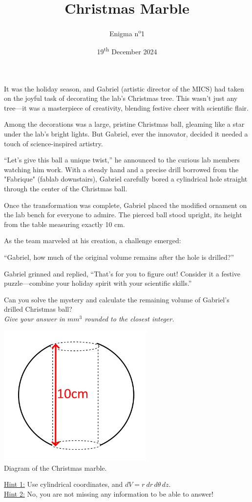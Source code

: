 \documentclass[a4paper, top=10mm]{article}
\title{\textbf{\huge{Christmas Marble}}}
\author{Enigma n\textsuperscript{o}1}
\date{19\textsuperscript{th} December 2024}
\begin{document}
	\maketitle
	
	It was the holiday season, and Gabriel (artistic director of the MICS) had taken on the joyful task of decorating the lab’s Christmas tree.
	This wasn’t just any tree—it was a masterpiece of creativity, blending festive cheer with scientific flair.
	
	Among the decorations was a large, pristine Christmas ball, gleaming like a star under the lab’s bright lights.
	But Gabriel, ever the innovator, decided it needed a touch of science-inspired artistry.
	
	“Let’s give this ball a unique twist,” he announced to the curious lab members watching him work. With a steady hand and a precise drill borrowed from the "Fabrique" (fablab downstairs), Gabriel carefully bored a cylindrical hole straight through the center of the Christmas ball.
	
	Once the transformation was complete, Gabriel placed the modified ornament on the lab bench for everyone to admire. The pierced ball stood upright, its height from the table measuring exactly 10 cm.
	
	As the team marveled at his creation, a challenge emerged:
	
	“Gabriel, how much of the original volume remains after the hole is drilled?”
	
	Gabriel grinned and replied, “That’s for you to figure out! Consider it a festive puzzle—combine your holiday spirit with your scientific skills.”
	
	Can you solve the mystery and calculate the remaining volume of Gabriel’s drilled Christmas ball?\\
	\textit{Give your answer in $mm^3$ rounded to the closest integer.}
	
	\begin{center}
		\includegraphics[height=200pt]{01xmas_pearl.png}\\
		Diagram of the Christmas marble.
	\end{center}
	
	\underline{Hint 1:} Use cylindrical coordinates, and $dV = r\ dr\, d\theta\, dz$.\\
	
	\underline{Hint 2:} No, you are not missing any information to be able to answer!
	
	
\end{document}
